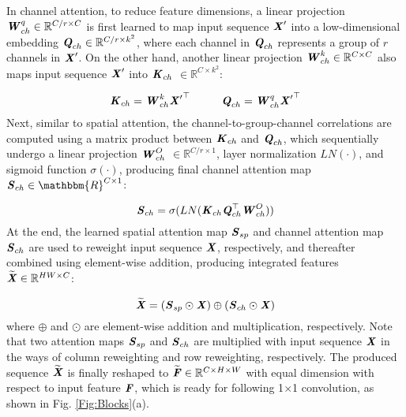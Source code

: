 \documentclass[lettersize,journal]{IEEEtran}
\begin{document}
In channel attention, to reduce feature dimensions, a linear projection $\textbf{\emph{W}}_{ch}^q\in\mathbb{R}^{C/r \times C}$ is first learned to map input sequence $\textbf{\emph{X}}^{\prime}$ into a low-dimensional embedding $\textbf{\emph{Q}}_{ch}\in\mathbb{R}^{C/r \times k^2}$, where each channel in $\textbf{\emph{Q}}_{ch}$ represents a group of $r$ channels in $\textbf{\emph{X}}^{\prime}$. On the other hand, another linear projection $\textbf{\emph{W}}_{ch}^k\in\mathbb{R}^{C \times C}$ also maps input sequence $\textbf{\emph{X}}^{\prime}$ into $\textbf{\emph{K}}_{ch}$ $\in \mathbb{R}^{C \times k^2}$:

\begin{equation}
    \textbf{\emph{K}}_{ch} = \textbf{\emph{W}}_{ch}^k{\textbf{\emph{X}}^{\prime}}^{\top} \hspace{1cm} \textbf{\emph{Q}}_{ch} = \textbf{\emph{W}}_{ch}^q{\textbf{\emph{X}}^{\prime}}^{\top}
\end{equation}
Next, similar to spatial attention, the channel-to-group-channel correlations are computed using a matrix product between $\textbf{\emph{K}}_{ch}$ and $\textbf{\emph{Q}}_{ch}$, which sequentially undergo a linear projection $\textbf{\emph{W}}_{ch}^O$ $\in \mathbb{R}^{C/r \times 1}$, layer normalization $LN(\cdot)$, and sigmoid function $\sigma(\cdot)$, producing final channel attention map $\textbf{\emph{S}}_{ch}\in\mathbbm{R}^{C \times 1}$:

\begin{equation}\label{eq:LSCM_CA}
    \textbf{\emph{S}}_{ch}  = \sigma(LN(\textbf{\emph{K}}_{ch}\textbf{\emph{Q}}_{ch}^{\top}\textbf{\emph{W}}_{ch}^O))
\end{equation}
At the end, the learned spatial attention map $\textbf{\emph{S}}_{sp}$ and channel attention map $\textbf{\emph{S}}_{ch}$ are used to reweight input sequence $\textbf{\emph{X}}$, respectively, and thereafter combined using element-wise addition, producing integrated features $\widetilde{\textbf{\emph{X}}}\in\mathbb{R}^{HW \times C}$:

\begin{equation}
    \widetilde{\textbf{\emph{X}}} = (\textbf{\emph{S}}_{sp}\odot \textbf{\emph{X}}) \oplus
    (\textbf{\emph{S}}_{ch} \odot \textbf{\emph{X}}) 
\end{equation}
where $\oplus$ and $\odot$ are element-wise addition and multiplication, respectively. Note that two attention maps $\textbf{\emph{S}}_{sp}$ and $\textbf{\emph{S}}_{ch}$ are multiplied with input sequence $\textbf{\emph{X}}$ in the ways of column reweighting and row reweighting, respectively. The produced sequence $\widetilde{\textbf{\emph{X}}}$ is finally reshaped to $\widetilde{\textbf{\emph{F}}}\in\mathbb{R}^{C \times H \times W}$ with equal dimension with respect to input feature $\textbf{\emph{F}}$, which is ready for following 1$\times$1 convolution, as shown in Fig. \ref{Fig:Blocks}(a).
\end{document}
